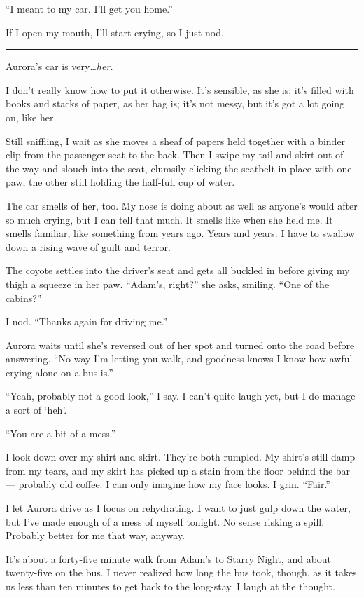 ``I meant to my car. I'll get you home.''

If I open my mouth, I'll start crying, so I just nod.

\begin{center}\rule{0.5\linewidth}{\linethickness}\end{center}

Aurora's car is very\ldots{}\emph{her.}

I don't really know how to put it otherwise. It's sensible, as she is; it's filled with books and stacks of paper, as her bag is; it's not messy, but it's got a lot going on, like her.

Still sniffling, I wait as she moves a sheaf of papers held together with a binder clip from the passenger seat to the back. Then I swipe my tail and skirt out of the way and slouch into the seat, clumsily clicking the seatbelt in place with one paw, the other still holding the half-full cup of water.

The car smells of her, too. My nose is doing about as well as anyone's would after so much crying, but I can tell that much. It smells like when she held me. It smells familiar, like something from years ago. Years and years. I have to swallow down a rising wave of guilt and terror.

The coyote settles into the driver's seat and gets all buckled in before giving my thigh a squeeze in her paw. ``Adam's, right?'' she asks, smiling. ``One of the cabins?''

I nod. ``Thanks again for driving me.''

Aurora waits until she's reversed out of her spot and turned onto the road before answering. ``No way I'm letting you walk, and goodness knows I know how awful crying alone on a bus is.''

``Yeah, probably not a good look,'' I say. I can't quite laugh yet, but I do manage a sort of `heh'.

``You are a bit of a mess.''

I look down over my shirt and skirt. They're both rumpled. My shirt's still damp from my tears, and my skirt has picked up a stain from the floor behind the bar --- probably old coffee. I can only imagine how my face looks. I grin. ``Fair.''

I let Aurora drive as I focus on rehydrating. I want to just gulp down the water, but I've made enough of a mess of myself tonight. No sense risking a spill. Probably better for me that way, anyway.

It's about a forty-five minute walk from Adam's to Starry Night, and about twenty-five on the bus. I never realized how long the bus took, though, as it takes us less than ten minutes to get back to the long-stay. I laugh at the thought.

